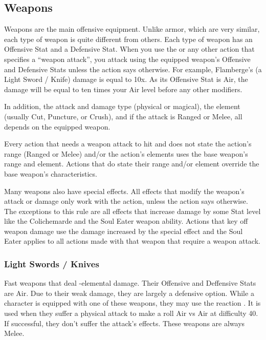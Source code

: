 \clearpage
\subsection{Weapons}
\label{subsec:inv-weapons}

\begin{multicols}{2}
Weapons are the main offensive equipment.  Unlike armor, which are very similar, each type of weapon is quite different from others.  Each type of weapon has an Offensive Stat and a Defensive Stat.  When you use the  or any other action that specifies a ``weapon attack'', you attack using the equipped weapon's Offensive and Defensive Stats unless the action says otherwise.  For example, Flamberge's (a Light Sword / Knife) damage is equal to 10x.  As its Offensive Stat is Air, the damage will be equal to ten times your Air level before any other modifiers.

In addition, the attack and damage type (physical or magical), the element (usually Cut, Puncture, or Crush), and if the attack is Ranged or Melee, all depends on the equipped weapon.

Every action that needs a weapon attack to hit and does not state the action's range (Ranged or Melee) and/or the action's elements uses the base weapon's range and element.  Actions that do state their range and/or element override the base weapon's characteristics.

Many weapons also have special effects.  All effects that modify the weapon's attack or damage only work with the  action, unless the action says otherwise.  The exceptions to this rule are all effects that increase damage by some Stat level like the Colichemarde and the Soul Eater weapon ability.  Actions that key off weapon damage use the damage increased by the special effect and the Soul Eater applies to all actions made with that weapon that require a weapon attack.
\end{multicols}

\begin{center}
\end{center}
\clearpage

\subsubsection{Light Swords / Knives}

Fast weapons that deal -elemental damage.  Their Offensive and Deffensive Stats are Air.  Due to their weak damage, they are largely a defensive option.  While a character is equipped with one of these weapons, they may use the reaction .  It is used when they suffer a physical attack to make a roll Air vs Air at difficulty 40.  If successful, they don't suffer the attack's effects.  These weapons are always Melee.

\begin{tabwpn}[label=inv-lsword,range=melee,type=physical,element=puncture,roll=airvair]
    \tabwpnrow[name=Femme Fatale,mlevel=64,cost=Artifact,damage=16x,effect=\tstatus{Death} touch \newline \telem{Shadow}-elemental damage]
\end{tabwpn}
